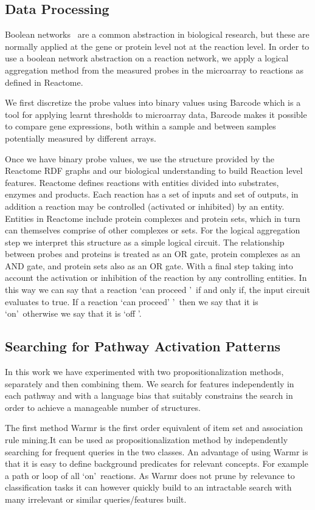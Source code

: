 \documentclass[runningheads,a4paper]{llncs}
\begin{document}
\subsection{Data Processing}
Boolean networks~\citep{wang_boolean_2012} are a common abstraction in biological research, but these are normally applied at the gene or protein level not at the reaction level. In order to use a boolean network abstraction on a reaction network, we apply a logical aggregation method from the measured probes in the microarray to reactions as defined in Reactome.

We first discretize the probe values into binary values using Barcode \citep{mccall_gene_2014} which is a tool for applying learnt thresholds to microarray data,  Barcode makes it possible to compare gene expressions, both within a sample and between samples potentially measured by different arrays. 

Once we have binary probe values, we use the structure provided by
the Reactome RDF graphs and our biological understanding to build Reaction level features.
Reactome defines reactions with entities divided into substrates, enzymes and products. Each reaction has a set of inputs and set of outputs, in addition a reaction may be controlled (activated or inhibited) by an entity. Entities in Reactome include protein complexes and protein sets, which in turn can themselves comprise of other complexes or sets. For the logical aggregation step we interpret this structure as a simple logical circuit. The relationship between probes and proteins is treated as an OR gate, protein complexes as an AND gate, and protein sets also as an OR gate. With a final step taking into account the activation or inhibition of the reaction by any controlling entities. In this way we can say that a reaction \lq can proceed \rq\ if and only if, the input circuit evaluates to true. If a reaction \lq can proceed' \rq\ then we say that it is \lq on\rq\ otherwise we say that it is \lq off \rq. 

\subsection{Searching for Pathway Activation Patterns}
In this work we have experimented with two propositionalization methods, separately and then combining them. We search for features independently in each pathway and with a language bias that suitably constrains the search in order to achieve a manageable number of structures. 

The first method Warmr \citep{dehaspe_mining_1997} is the first order equivalent of item set and association rule mining.It can be used as propositionalization method by independently searching for frequent queries in the two classes. An advantage of using Warmr is that it is easy to define background predicates for relevant concepts. For example a path or loop of all \lq on\rq\ reactions. As Warmr does not prune by relevance to classification tasks it can however quickly build to an intractable search with many irrelevant or similar queries/features built. 
	     
\end{document}
